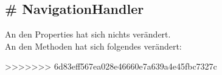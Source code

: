 \documentclass[../implementierung.tex]{subfiles}
\begin{document}
		\subsection{\# NavigationHandler}
			An den Properties hat sich nichts verändert. \\
			An den Methoden hat sich folgendes verändert:
			\begin{itemize}

>>>>>>> 6d83eff567ea028e46660e7a639a4e45fbc7327c
			\end{itemize}
\end{document}
